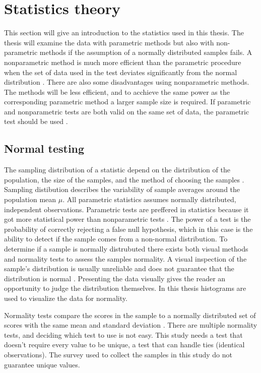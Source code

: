 \section{Statistics theory}\label{sec:statistic_theory}
This section will give an introduction to the statistics used in this thesis. The thesis will examine the data with parametric methods but also with non-parametric methods if the assumption of a normally distributed samples fails. A nonparametric method is much more efficient than the parametric procedure when the set of data used in the test deviates significantly from the normal distribution \citep{Walpole2012}. There are also some disadvantages using nonparametric methods. The methods will be less efficient, and to acchieve the same power as the corresponding parametric method a larger sample size is required. If parametric and nonparametric tests are both valid on the same set of data, the parametric test should be used \citep{Walpole2012}. 

\subsection{Normal testing}\label{sec:normaltesting}
The sampling distribution of a statistic depend on the distribution of the population, the size of the samples, and the method of choosing the samples \citep{Walpole2012}. Sampling distibution describes the variability of sample averages around the population mean $\mu$. All parametric statistics assumes normally distributed, independent observations. Parametric tests are preffered in statistics because it got more statistical power than nonparametric tests \citep{Frost2015}. The power of a test is the probability of correctly rejecting a false null hypothesis, which in this case is the ability to detect if the sample comes from a non-normal distribution. To determine if a sample is normally distrubuted there exists both visual methods and normality tests to assess the samples normality. A visual inspection of the sample's distribution is usually unreliable and does not guarantee that the distribution is normal \citep{Pearson2006}. Presenting the data visually gives the reader an opportunity to judge the distribution themselves. In this thesis histograms are used to visualize the data for normality. 

Normality tests compare the scores in the sample to a normally distributed set of scores with the same mean and standard deviation \citep{Ghasemi2012}. There are multiple normality tests, and deciding which test to use is not easy. This study needs a test that doesn't require every value to be unique, a test that can handle ties (identical observations). The survey used to collect the samples in this study do not guarantee unique values. 

